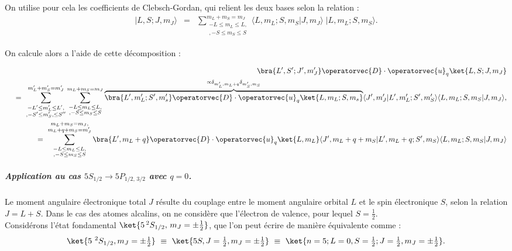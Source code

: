 On utilise pour cela les coefficients de Clebsch-Gordan, qui relient les deux bases selon la relation :
\begin{eqnarray}
	|L, S; J, m_J\rangle  &=& \sum_{\substack{-L \leq m_L \leq L,\\, -S \leq m_S \leq S  }}^{m_L + m_S = m_J} \langle L, m_L; S, m_S | J, m_J \rangle \; |L, m_L; S, m_S\rangle.
\end{eqnarray}

On calcule alors a l'aide de cette décomposition :

\begin{eqnarray}
	&&\bra{L' , S' ; J' , m_J' }  \operatorvec{D} \cdot \operatorvec{u}_q 	\ket{L , S ; J , m_J }  \\
	&&~ = ~ \sum_{\substack{-L' \leq m_L' \leq L',\\, -S' \leq m_S', \leq S''}}^{m_L' + m_S'= m_J'}\sum_{\substack{-L \leq m_L \leq L,\\, -S \leq m_S \leq S }}^{m_L + m_S = m_J} \overbrace{\bra{L',m_L';S',m_s'} \operatorvec{D} \cdot \operatorvec{u}_q \ket{L,m_L;S,m_s}}^{\propto \delta_{m_L',m_L+q}\delta_{m_S',m_S}} \langle J' , m_J' \vert L' , m_L' ; S' , m_S' \rangle \langle L , m_L ; S , m_S \vert J , m_J \rangle ,\\
	&&~ = ~  \sum_{\substack{-L \leq m_L \leq L,\\, -S \leq m_S \leq S}}^{\substack{ m_L + m_S = m_J, \\ m_L + q + m_S = m_J'}} \bra{L', m_L+q} \operatorvec{D} \cdot \operatorvec{u}_q \ket{L,m_L}\langle J' , m_L + q + m_S \vert L' ,  m_L + q  ; S' ,  m_S \rangle \langle L , m_L ; S , m_S \vert J , m_J \rangle
\end{eqnarray}


\subparagraph{Application au cas $5S_{1/2} \rightarrow 5P_{1/2,\,3/2}$ avec $q = 0$.}


Le moment angulaire électronique total $J$ résulte du couplage entre le moment angulaire orbital $L$ et le spin électronique $S$, selon la relation $J = L + S$. Dans le cas des atomes alcalins, on ne considère que l’électron de valence, pour lequel $S = \tfrac12$.\\

Considérons l’état fondamental $\ket{5\,^2S_{1/2},\,m_J = \pm \tfrac12}$, que l’on peut écrire de manière équivalente comme :
\begin{eqnarray*}
	\ket{ 5{~}^2S_{1/2} , m_J = \pm \tfrac12  } ~\equiv~ \ket{ 5S , J=\tfrac12  , m_J= \pm \tfrac12  }  ~\equiv~ \ket{n=5 ; L=0 , S=\tfrac12 ;  J=\tfrac12  , m_J = \pm \tfrac12 }.
\end{eqnarray*}

